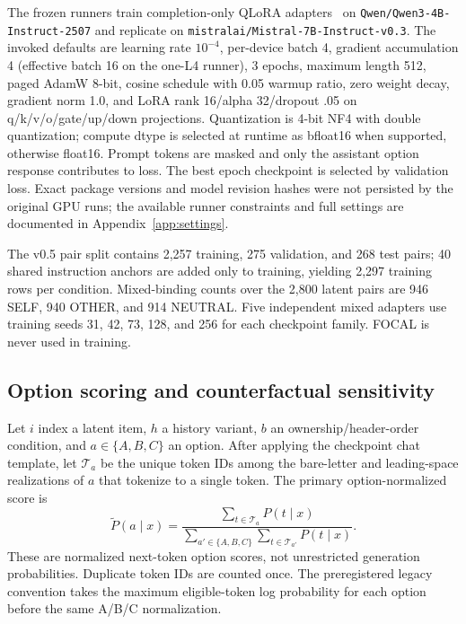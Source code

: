 \documentclass{article}
\begin{document}
The frozen runners train completion-only QLoRA adapters~\citep{dettmers2023qlora,hu2021lora} on \texttt{Qwen/Qwen3-4B-Instruct-2507} and replicate on \texttt{mistralai/Mistral-7B-Instruct-v0.3}. The invoked defaults are learning rate $10^{-4}$, per-device batch 4, gradient accumulation 4 (effective batch 16 on the one-L4 runner), 3 epochs, maximum length 512, paged AdamW 8-bit, cosine schedule with 0.05 warmup ratio, zero weight decay, gradient norm 1.0, and LoRA rank 16/alpha 32/dropout .05 on q/k/v/o/gate/up/down projections. Quantization is 4-bit NF4 with double quantization; compute dtype is selected at runtime as bfloat16 when supported, otherwise float16. Prompt tokens are masked and only the assistant option response contributes to loss. The best epoch checkpoint is selected by validation loss. Exact package versions and model revision hashes were not persisted by the original GPU runs; the available runner constraints and full settings are documented in Appendix~\ref{app:settings}.

The v0.5 pair split contains 2,257 training, 275 validation, and 268 test pairs; 40 shared instruction anchors are added only to training, yielding 2,297 training rows per condition. Mixed-binding counts over the 2,800 latent pairs are 946 SELF, 940 OTHER, and 914 NEUTRAL. Five independent mixed adapters use training seeds 31, 42, 73, 128, and 256 for each checkpoint family. FOCAL is never used in training.

\subsection{Option scoring and counterfactual sensitivity}

Let $i$ index a latent item, $h$ a history variant, $b$ an ownership/header-order condition, and $a\in\{A,B,C\}$ an option. After applying the checkpoint chat template, let $\mathcal{T}_a$ be the unique token IDs among the bare-letter and leading-space realizations of $a$ that tokenize to a single token. The primary option-normalized score is
\begin{equation}
\label{eq:ptilde}
\widetilde P(a\mid x)=\frac{\sum_{t\in\mathcal{T}_a} P(t\mid x)}{\sum_{a'\in\{A,B,C\}}\sum_{t\in\mathcal{T}_{a'}}P(t\mid x)}.
\end{equation}
These are normalized next-token option scores, not unrestricted generation probabilities. Duplicate token IDs are counted once. The preregistered legacy convention takes the maximum eligible-token log probability for each option before the same A/B/C normalization.
\end{document}
